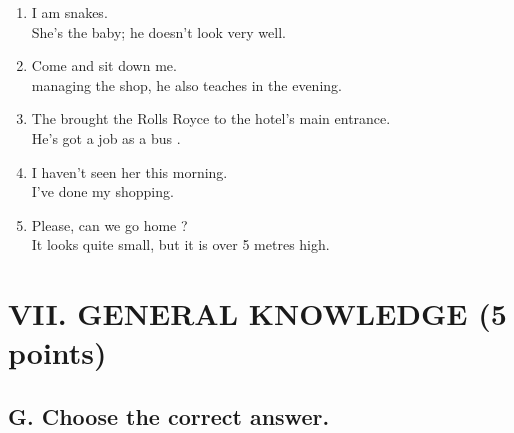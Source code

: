 \documentclass[11pt,a4paper]{article}
\begin{document}
\begin{enumerate}
    \item I am \underline{\hspace{3cm}} snakes. \\
    She's \underline{\hspace{3cm}} the baby; he doesn't look very well.

    \item Come and sit down \underline{\hspace{3cm}} me. \\
    \underline{\hspace{3cm}} managing the shop, he also teaches in the evening.

    \item The \underline{\hspace{3cm}} brought the Rolls Royce to the hotel's main entrance. \\
    He's got a job as a bus \underline{\hspace{3cm}}.

    \item I haven't seen her \underline{\hspace{3cm}} this morning. \\
    I've \underline{\hspace{3cm}} done my shopping.

    \item Please, can we go home \underline{\hspace{3cm}}? \\
    It looks quite small, but \underline{\hspace{3cm}} it is over 5 metres high.
\end{enumerate}

\section{VII. GENERAL KNOWLEDGE (5 points)}

\subsection{G. Choose the correct answer.}
\end{document}
